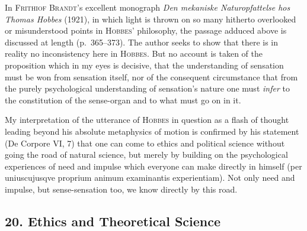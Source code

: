 \documentclass[12pt]{book}
\newcommand{\opage}[1]{\marginnote{\footnotesize\textit{[#1]}}}
\begin{document}
In \textsc{Frithiof Brandt}'s excellent monograph \textit{Den mekaniske
Naturopfattelse hos Thomas Hobbes} (1921), in which light is thrown on so many
hitherto overlooked or misunderstood points in \textsc{Hobbes}' philosophy, the
passage adduced above is discussed at length (p.\ 365--373). The author seeks to
show that there is in reality no inconsistency here in \textsc{Hobbes}. But no
account is taken of the proposition which in my eyes is decisive, that the
understanding of sensation must be won from sensation itself, nor of the
consequent circumstance that from the purely psychological understanding of
\opage{119}sensation's nature one must \textit{infer} to the constitution of the sense-organ
and to what must go on in it.

My interpretation of the utterance of \textsc{Hobbes} in question as a flash of
thought leading beyond his absolute metaphysics of motion is confirmed by his
statement (De Corpore VI, 7) that one can come to ethics and political science
without going the road of natural science, but merely by building on the
psychological experiences of need and impulse which everyone can make directly in
himself (per uniuscujusqve proprium animum examinantis experientiam). Not only
need and impulse, but sense-sensation too, we know directly by this road.

\subsection*{20. Ethics and Theoretical Science}
\end{document}
